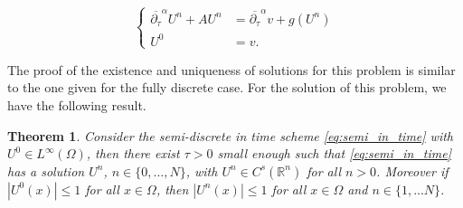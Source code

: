\documentclass{amsart}
\newcommand{\W}{\Omega}
\newcommand{\dtd}{\overline{\partial_{\tau}}}
\newcommand{\fmonio}{g}
\newtheorem{theorem}{Theorem}[section]
\theoremstyle{remark}
\theoremstyle{definition}
\numberwithin{equation}{section}
\begin{document}
\begin{equation} 
\left\lbrace
  \begin{array}{rl}
      \dtd^{\alpha} U^n   +  A U^n & =  \dtd^{\alpha}v +  \fmonio(U^n) \\
      U^0 & = v.
      \end{array}
\label{eq:semi_in_time}
\right.
\end{equation}


The proof of the existence and uniqueness of solutions for this problem is similar to the one given for the fully discrete case. For the solution of this problem, we have the following result. 

\begin{theorem}
\label{teo:existencia_bound_semi_tiempo}
Consider the semi-discrete in time scheme \eqref{eq:semi_in_time} with $U^0 \in L^{\infty}(\W)$, then there exist $\tau>0$ small enough such that \eqref{eq:semi_in_time} has a solution $U^n$, $n \in \{0,...,N\}$, with $U^n \in C^{s}(\mathbb{R}^n)$ for all $n>0$. Moreover if $|U^0(x)| \leq 1$ for all $x \in \W$, then $|U^n(x)| \leq 1$ for all $x \in \W$ and $n \in \{1,...N\}$. 
 
\end{theorem}
\end{document}
